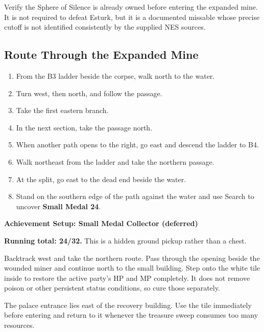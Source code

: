 \documentclass[
  american,
  10pt,
  letterpaper,
  oneside,
  open=any]{scrreprt}
\providecommand{\tightlist}{%
  \setlength{\itemsep}{0pt}\setlength{\parskip}{0pt}}
\begin{document}
Verify the Sphere of Silence is already owned before entering the
expanded mine. It is not required to defeat Esturk, but it is a
documented missable whose precise cutoff is not identified consistently
by the supplied NES sources.

\subsection{Route Through the Expanded
Mine}\label{route-through-the-expanded-mine}

\begin{enumerate}
\def\labelenumi{\arabic{enumi}.}
\tightlist
\item
  From the B3 ladder beside the corpse, walk north to the water.
\item
  Turn west, then north, and follow the passage.
\item
  Take the first eastern branch.
\item
  In the next section, take the passage north.
\item
  When another path opens to the right, go east and descend the ladder
  to B4.
\item
  Walk northeast from the ladder and take the northern passage.
\item
  At the split, go east to the dead end beside the water.
\item
  Stand on the southern edge of the path against the water and use
  Search to uncover \textbf{Small Medal 24}.
\end{enumerate}

\begin{achievementsetup}

\textbf{Achievement Setup: Small Medal Collector (deferred)}

\textbf{Running total: 24/32.} This is a hidden ground pickup rather
than a chest.

\end{achievementsetup}

Backtrack west and take the northern route. Pass through the opening
beside the wounded miner and continue north to the small building. Step
onto the white tile inside to restore the active party's HP and MP
completely. It does not remove poison or other persistent status
conditions, so cure those separately.

The palace entrance lies east of the recovery building. Use the tile
immediately before entering and return to it whenever the treasure sweep
consumes too many resources.
\end{document}
